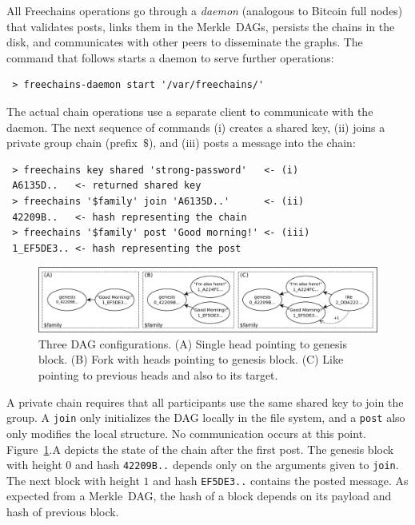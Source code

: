 \documentclass[10pt,journal,compsoc]{IEEEtran}
\newcommand{\FC}       {Freechains\xspace}
\newcommand{\code}[1]  {\texttt{\footnotesize{#1}}}
\begin{document}
All \FC operations go through a \emph{daemon} (analogous to Bitcoin full nodes)
that validates posts, links them in the Merkle~DAGs, persists the chains in
the disk, and communicates with other peers to disseminate the graphs.
The command that follows starts a daemon to serve further operations:

{\footnotesize
\begin{verbatim}
 > freechains-daemon start '/var/freechains/'
\end{verbatim}
}

The actual chain operations use a separate client to communicate with the
daemon.
The next sequence of commands (i) creates a shared key, (ii) joins a private
group chain (prefix~$\$$), and (iii) posts a message into the chain:

{\footnotesize
\begin{verbatim}
 > freechains key shared 'strong-password'   <- (i)
 A6135D..   <- returned shared key
 > freechains '$family' join 'A6135D..'      <- (ii)
 42209B..   <- hash representing the chain
 > freechains '$family' post 'Good morning!' <- (iii)
 1_EF5DE3.. <- hash representing the post
\end{verbatim}
}

\begin{figure}
\centering
\includegraphics[width=\textwidth]{family.png}
\caption{
    Three DAG configurations.
    (A) Single head pointing to genesis block.
    (B) Fork with heads pointing to genesis block.
    (C) Like pointing to previous heads and also to its target.
}
\label{fig.family}
\end{figure}

A private chain requires that all participants use the same shared key to join
the group.
A \code{join} only initializes the DAG locally in the file system, and a
\code{post} also only modifies the local structure.
No communication occurs at this point.
Figure~\ref{fig.family}.A depicts the state of the chain after the first post.
The genesis block with height $0$ and hash \code{42209B..}
depends only on the arguments given to \code{join}.
The next block with height $1$ and hash \code{EF5DE3..} contains the posted
message.
As expected from a Merkle~DAG, the hash of a block depends on its payload and
hash of previous block.
\end{document}
